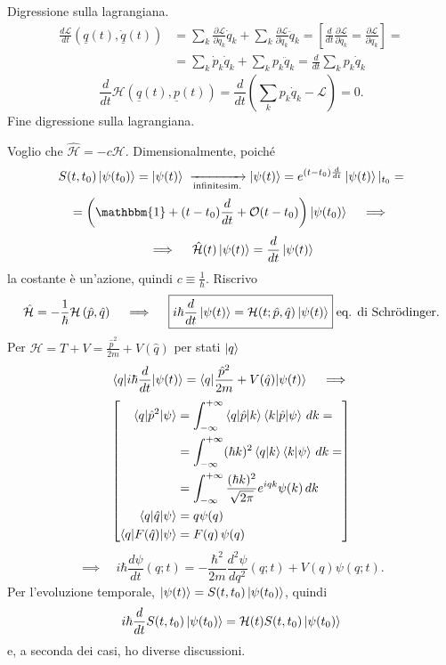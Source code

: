 \bigskip
\noindent
Digressione sulla lagrangiana.
\begin{align*}
\frac{d \mathcal{L}}{dt} \left( \underline{q}(t), \dot{\underline{q}}(t) \right) &= \sum_k \frac{\partial \mathcal{L}}{\partial q_k} \dot{q}_k + \sum_k \frac{\partial \mathcal{L}}{\partial \dot{q}_k} \ddot{q}_k = \left[ \frac{d}{dt} \frac{\partial \mathcal{L}}{\partial \dot{q}_k} = \frac{\partial \mathcal{L}}{\partial q_k} \right] = \\
&= \sum_k \dot{p}_k \dot{q}_k + \sum_k p_k \ddot{q}_k = \frac{d}{dt} \sum_k p_k \dot{q}_k
\end{align*}
\[
\frac{d}{dt} \mathcal{H} \left( \underline{q}(t), \underline{p}(t) \right) = \frac{d}{dt} \left( \sum_k p_k \dot{q}_k - \mathcal{L} \right) = 0.
\]
Fine digressione sulla lagrangiana.

\bigskip
\noindent
Voglio che \(\hat{\mathcal{H}} = -c \mathcal{H}\). Dimensionalmente, poiché
\[
S(t, t_0) \ket{\psi(t_0)} = \ket{\psi(t)} \; \xrightarrow[\text{infinitesim.}] \; \ket{\psi(t)} = e^{(t - t_0) \frac{d}{dt}} \ket{\psi(t)} |_{t_0} =
\]
\[
= \left( \mathbbm{1} + (t - t_0) \frac{d}{dt} + \mathcal{O}(t - t_0) \right) \ket{\psi(t_0)} \quad \implies
\]
\[
\implies \quad \hat{\mathcal{H}}(t) \ket{\psi(t)} = \frac{d}{dt} \ket{\psi(t)}
\]
la costante è un'azione, quindi \( c \equiv \frac{1}{\hbar} \). Riscrivo
\[
\hat{\mathcal{H}} = - \frac{1}{\hbar} \mathcal{H} \left( \hat{p}, \hat{q} \right) \quad \implies \quad \boxed{i \hbar \frac{d}{dt} \ket{\psi(t)} = \mathcal{H}( t; \hat{p}, \hat{q}) \ket{\psi(t)}} \; \text{eq. di Schr\"odinger.}
\]
Per \( \mathcal{H} = T + V = \frac{\hat{p}^2}{2m} + V(\hat{q}) \) per stati \( \ket{q} \)
\[
\braket{q|i \hbar \frac{d}{dt}|\psi(t)} = \braket{q|\frac{\hat{p}^2}{2m} + V(\hat{q})|\psi(t)} \quad \implies
\]
\[
\left[
\begin{aligned}
\braket{q|\hat{p}^2|\psi} &= \int_{-\infty}^{+\infty} \braket{q|\hat{p}|k} \braket{k|\hat{p}|\psi} \, dk = \\
&= \int_{-\infty}^{+\infty} (\hbar k)^2 \braket{q|k} \braket{k|\psi} \, dk = \\
&= \int_{-\infty}^{+\infty} \frac{(\hbar k)^2}{\sqrt{2\pi}} e^{iqk} \psi(k) \, dk \\
\braket{q|\hat{q}|\psi} &= q \psi(q) \\
\braket{q|F(\hat{q})|\psi} &= F(q) \, \psi(q)
\end{aligned}
\right]
\]
\[
\implies \quad i \hbar \frac{d \psi}{dt}(q; t) = - \frac{\hbar^2}{2m} \frac{d^2 \psi}{dq^2}(q;t) + V(q) \psi(q;t).
\]
Per l'evoluzione temporale, \( \ket{\psi(t)} = S(t, t_0) \ket{\psi(t_0)} \), quindi
\[
i \hbar \frac{d}{dt} S(t, t_0) \ket{\psi(t_0)} = \mathcal{H}(t) S(t, t_0) \ket{\psi(t_0)}
\]
e, a seconda dei casi, ho diverse discussioni.

